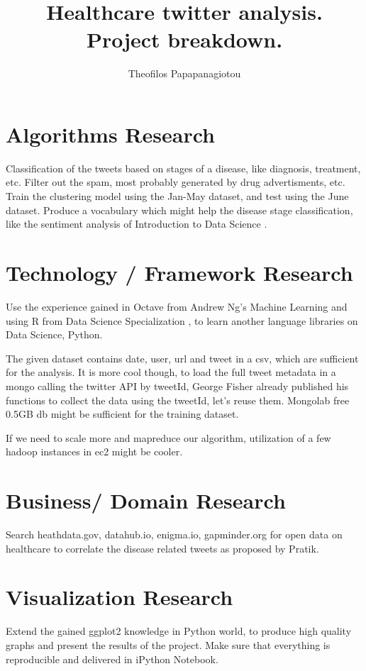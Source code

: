 \documentclass{article}
\begin{document}
\title{Healthcare twitter analysis.\\
Project breakdown.}
\author{Theofilos Papapanagiotou}

\maketitle

\section{Algorithms Research}
Classification of the tweets based on stages of a disease, like diagnosis,
treatment, etc.
Filter out the spam, most probably generated by drug advertisments, etc.
Train the clustering model using the Jan-May dataset, and test using
the June dataset.
Produce a vocabulary which might help the disease stage classification,
like the sentiment analysis of Introduction to Data Science \cite{introds}.

\section{Technology / Framework Research}
Use the experience gained in Octave from Andrew Ng's Machine Learning \cite{ml} and
using R from Data Science Specialization \cite{datascispe}, to learn another language
libraries on Data Science, Python.

The given dataset contains date, user, url and tweet in a csv, which are
sufficient for the analysis. It is more cool though, to load the full tweet
metadata in a mongo calling the twitter API by tweetId, George Fisher
\cite{GeorgeFisher} already published his functions to collect the data using
the tweetId, let's reuse them. Mongolab free 0.5GB db might be sufficient for
the training dataset.

If we need to scale more and mapreduce our algorithm, utilization of a few
hadoop instances in ec2 might be cooler.

\section{Business/ Domain Research}
Search heathdata.gov, datahub.io, enigma.io, gapminder.org for open data on
healthcare to correlate the disease related tweets as proposed by Pratik.

\section{Visualization Research}
Extend the gained ggplot2 knowledge in Python world, to produce high quality
graphs and present the results of the project.
Make sure that everything is reproducible and delivered in iPython Notebook.
\end{document}
